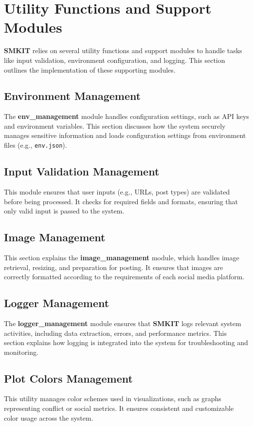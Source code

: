 \section{Utility Functions and Support Modules}
\label{sec:utility_functions_and_support_modules}
\textbf{SMKIT} relies on several utility functions and support modules to handle tasks like input validation, environment configuration, and logging. This section outlines the implementation of these supporting modules.

\subsection{Environment Management}
\label{subsec:Environment_management}
The \textbf{env\_management} module handles configuration settings, such as API keys and environment variables. This section discusses how the system securely manages sensitive information and loads configuration settings from environment files (e.g., \texttt{env.json}).

\subsection{Input Validation Management}
\label{subsec:input_validation_management}
This module ensures that user inputs (e.g., URLs, post types) are validated before being processed. It checks for required fields and formats, ensuring that only valid input is passed to the system.

\subsection{Image Management}
\label{subsec:image_management}
This section explains the \textbf{image\_management} module, which handles image retrieval, resizing, and preparation for posting. It ensures that images are correctly formatted according to the requirements of each social media platform.

\subsection{Logger Management}
\label{subsec:logger_management}
The \textbf{logger\_management} module ensures that \textbf{SMKIT} logs relevant system activities, including data extraction, errors, and performance metrics. This section explains how logging is integrated into the system for troubleshooting and monitoring.

\subsection{Plot Colors Management}
\label{subsec:plot_colors_management}
This utility manages color schemes used in visualizations, such as graphs representing conflict or social metrics. It ensures consistent and customizable color usage across the system.

